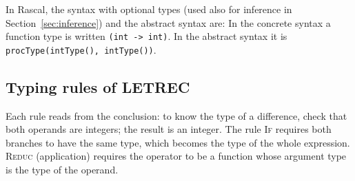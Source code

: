 In Rascal, the syntax with optional types (used also for inference in
Section~\ref{sec:inference}) and the abstract syntax are:
In the concrete syntax a function type is written \texttt{(int -> int)}. In the
abstract syntax it is \texttt{procType(intType(), intType())}.

\subsection{Typing rules of LETREC}

Each rule reads from the conclusion: to know the type of a difference, check
that both operands are integers; the result is an integer. The rule
\textsc{If} requires both branches to have the same type, which becomes the
type of the whole expression. \textsc{Reduc} (application) requires the
operator to be a function whose argument type is the type of the operand.

